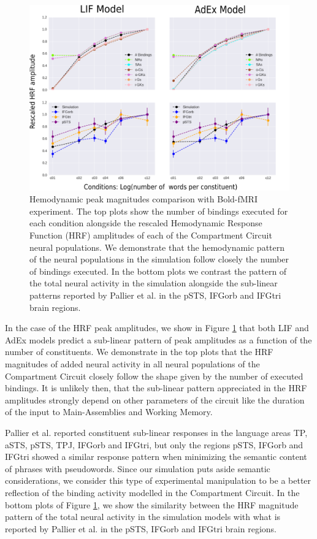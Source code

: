 \documentclass[10pt]{article}
\begin{document}
\begin{figure}[h!]
  \begin{center}
    \includegraphics[width=1.00\columnwidth]{figures/pnas_comparison-02}
    \caption{{Hemodynamic peak magnitudes comparison with Bold-fMRI experiment.
    The top plots show the number of bindings executed for each condition alongside the rescaled Hemodynamic Response Function (HRF) amplitudes of each of the Compartment Circuit neural populations.
    We demonstrate that the hemodynamic pattern of the neural populations in the simulation follow closely the number of bindings executed.
    In the bottom plots we contrast the pattern of the total neural activity in the simulation alongside the sub-linear patterns reported by Pallier et al. in the pSTS, IFGorb and IFGtri brain regions.
        {\label{fig:pnas-2}}%
      }}
  \end{center}
\end{figure}


In the case of the HRF peak amplitudes, we show in Figure \ref{fig:pnas-2} that both LIF and AdEx models predict a sub-linear pattern of peak amplitudes as a function of the number of constituents.
We demonstrate in the top plots that the HRF magnitudes of added neural activity in all neural populations of the Compartment Circuit closely follow the shape given by the number of executed bindings.
It is unlikely then, that the sub-linear pattern appreciated in the HRF amplitudes strongly depend on other parameters of the circuit like the duration of the input to Main-Assemblies and Working Memory.

Pallier et al. reported constituent sub-linear responses in the language areas TP, aSTS, pSTS, TPJ, IFGorb and IFGtri, but only the regions pSTS, IFGorb and IFGtri showed a similar response pattern when minimizing the semantic content of phrases with pseudowords.
Since our simulation puts aside semantic considerations, we consider this type of experimental manipulation to be a better reflection of the binding activity modelled in the Compartment Circuit.
In the bottom plots of Figure \ref{fig:pnas-2}, we show the similarity between the HRF magnitude pattern of the total neural activity in the simulation models with what is reported by Pallier et al. in the pSTS, IFGorb and IFGtri brain regions.
\end{document}
